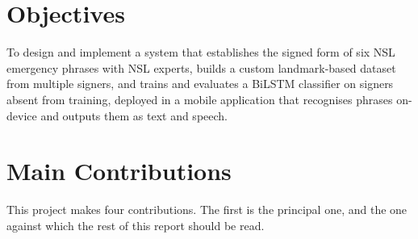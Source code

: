 \section{Objectives}
\label{sec:objectives}

To design and implement a system that establishes the signed form of six NSL emergency phrases with NSL experts, builds a custom landmark-based dataset from multiple signers, and trains and evaluates a BiLSTM classifier on signers absent from training, deployed in a mobile application that recognises phrases on-device and outputs them as text and speech.

\section{Main Contributions}
\label{sec:contributions}

This project makes four contributions. The first is the principal one, and the one against which the rest of this report should be read.

